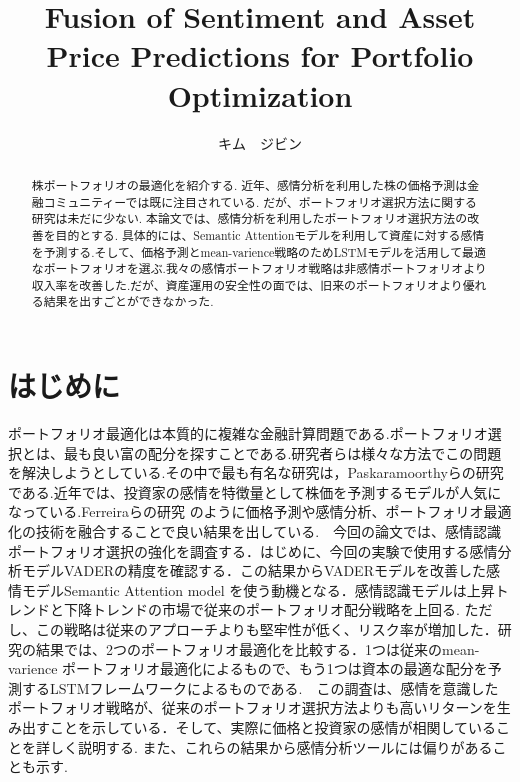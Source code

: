 \documentclass[submit,techrep,noauthor]{ipsj}
\begin{document}
\title{Fusion of Sentiment and Asset Price Predictions for Portfolio Optimization}


\author{キム　ジビン}{}{} %

\begin{abstract}
株ポートフォリオの最適化を紹介する. 近年、感情分析を利用した株の価格予測は金融コミュニティーでは既に注目されている. だが、ポートフォリオ選択方法に関する研究は未だに少ない. 
本論文では、感情分析を利用したポートフォリオ選択方法の改善を目的とする. 具体的には、Semantic Attentionモデルを利用して資産に対する感情を予測する.そして、価格予測とmean-varience戦略のためLSTMモデルを活用して最適なポートフォリオを選ぶ.我々の感情ポートフォリオ戦略は非感情ポートフォリオより収入率を改善した.だが、資産運用の安全性の面では、旧来のポートフォリオより優れる結果を出すごとができなかった.
\end{abstract}


\maketitle

\section{はじめに}
ポートフォリオ最適化は本質的に複雑な金融計算問題である.ポートフォリオ選択とは、最も良い富の配分を探すことである.研究者らは様々な方法でこの問題を解決しようとしている.その中で最も有名な研究は，Paskaramoorthyらの研究\cite{first}である.近年では、投資家の感情を特徴量として株価を予測するモデルが人気になっている.Ferreiraらの研究 \cite{second}のように価格予測や感情分析、ポートフォリオ最適化の技術を融合することで良い結果を出している.　今回の論文では、感情認識ポートフォリオ選択の強化を調査する．はじめに、今回の実験で使用する感情分析モデルVADERの精度を確認する．この結果からVADERモデルを改善した感情モデルSemantic Attention model を使う動機となる．感情認識モデルは上昇トレンドと下降トレンドの市場で従来のポートフォリオ配分戦略を上回る. ただし、この戦略は従来のアプローチよりも堅牢性が低く、リスク率が増加した．研究の結果では、2つのポートフォリオ最適化を比較する．1つは従来のmean-varience ポートフォリオ最適化によるもので、もう1つは資本の最適な配分を予測するLSTMフレームワークによるものである.　この調査は、感情を意識したポートフォリオ戦略が、従来のポートフォリオ選択方法よりも高いリターンを生み出すことを示している．そして、実際に価格と投資家の感情が相関していることを詳しく説明する. また、これらの結果から感情分析ツールには偏りがあることも示す.
\end{document}

